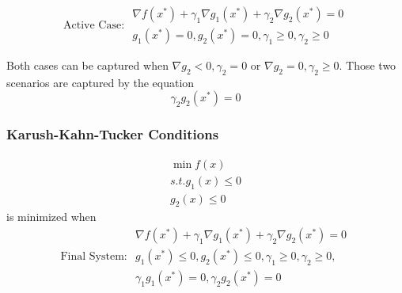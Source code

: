 \begin{equation}
  \text{Active Case: }
  \begin{aligned}
    \nabla f(x^*) + \gamma_1 \nabla g_1(x^*) + \gamma_2 \nabla g_2(x^*)  = 0 \\
    g_1(x^*) = 0, g_2(x^*) = 0, \gamma_1 \geq 0, \gamma_2 \geq 0
  \end{aligned}
\end{equation}

Both cases can be captured when $\nabla g_2 < 0, \gamma_2 = 0$ or  $\nabla g_2 = 0, \gamma_2 \geq 0$. Those two scenarios are captured by the equation 
\begin{equation}
  \gamma_2 g_2(x^*) = 0
\end{equation}
\subsubsection{Karush-Kahn-Tucker Conditions}
\begin{equation}
  \begin{aligned}
    \min f(x) \\
    s.t. g_1(x) \leq 0 \\
    g_2(x) \leq 0
  \end{aligned}
\end{equation}
is minimized when 
\begin{equation}
  \text{Final System: }
  \begin{aligned}
    \nabla f(x^*) + \gamma_1 \nabla g_1(x^*) + \gamma_2 \nabla g_2(x^*)  = 0 \\
    g_1(x^*) \leq 0, g_2(x^*) \leq 0, \gamma_1 \geq 0, \gamma_2 \geq 0, \\
    \gamma_1 g_1(x^*)=0, \gamma_2 g_2(x^*) = 0
  \end{aligned}
\end{equation}
